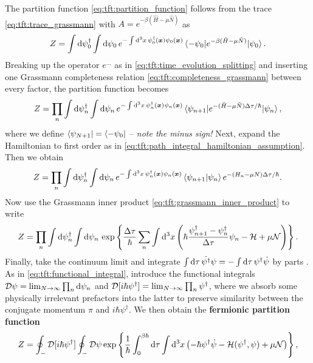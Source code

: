 The partition function \eqref{eq:tft:partition_function} follows from the trace \eqref{eq:tft:trace_grassmann} with $A = e^{-\beta (\hat{H} - \mu \hat{N})}$ as
\begin{equation}
	Z = \int \mathop{}\!\mathrm{d} \psi_0^\dagger \int \mathop{}\!\mathrm{d} \psi_0 \, e^{-\int \mathop{}\!\mathrm{d}^3 x \, \psi_{0}^\dagger({\bm{x}}) \psi_{0}({\bm{x}})} \braket{-\psi_0 | e^{-\beta(\hat{H} - \mu \hat{N})} | \psi_0} .
\end{equation}
Breaking up the operator $e^{\ldots}$ as in \cref{eq:tft:time_evolution_splitting} and inserting one Grassmann completeness relation \eqref{eq:tft:completeness_grassmann} between every factor, the partition function becomes
\begin{equation}
	Z = \prod_n \int \mathop{}\!\mathrm{d} \psi_n^\dagger \int \mathop{}\!\mathrm{d} \psi_n \, e^{-\int \mathop{}\!\mathrm{d}^3 x \, \psi_{n}^\dagger({\bm{x}}) \psi_{n}({\bm{x}})} \braket{\psi_{n+1} | e^{-(\hat{H} - \mu \hat{N}) \Delta \tau / \hbar} | \psi_n} ,
\end{equation}
where we define $\bra{\psi_{N+1}} = \bra{-\psi_0}$ -- \emph{note the minus sign!}
Next, expand the Hamiltonian to first order as in \cref{eq:tft:path_integral_hamiltonian_assumption}.
Then we obtain
\begin{equation}
	Z = \prod_n \int \mathop{}\!\mathrm{d} \psi_n^\dagger \int \mathop{}\!\mathrm{d} \psi_n \, e^{-\int \mathop{}\!\mathrm{d}^3 x \, \psi_{n}^\dagger({\bm{x}}) \psi_{n}({\bm{x}})} \braket{\psi_{n+1} | \psi_n} e^{-(H_n - \mu N) \Delta \tau / \hbar} .
\end{equation}
Now use the Grassmann inner product \eqref{eq:tft:grassmann_inner_product} to write
\begin{equation}
	Z = \prod_n \int \mathop{}\!\mathrm{d} \psi_n^\dagger \int \mathop{}\!\mathrm{d} \psi_n \, \exp \left\{ \frac{\Delta \tau}{\hbar} \sum_n \int \mathop{}\!\mathrm{d}^3 x \left( \hbar \frac{\psi^\dagger_{n+1} - \psi^\dagger_n}{\Delta \tau} \psi_{n} - \mathcal{H} + \mu \mathcal{N} \right) \right\} .
\end{equation}
Finally, take the continuum limit and integrate $\int \mathop{}\!\mathrm{d} \tau \, \dot{\psi^\dagger} \psi = -\int \mathop{}\!\mathrm{d} \tau \, \psi^\dagger \dot{\psi}$ by parts .
As in \eqref{eq:tft:functional_integral}, introduce the functional integrals $\mathcal{D} \psi = \lim_{N \rightarrow \infty} \prod_n \mathop{}\!\mathrm{d} \psi_n$ and $\mathcal{D} [i \hbar \psi^\dagger] = \lim_{N \rightarrow \infty} \prod_n \psi^\dagger$, where we absorb some physically irrelevant prefactors into the latter to preserve similarity between the conjugate momentum $\pi$ and $i \hbar \psi^\dagger$. 
We then obtain the \textbf{fermionic partition function}
\begin{equation}
	Z = \oint_- \mathcal{D} [i \hbar \psi^\dagger] \oint_- \mathcal{D} \psi \exp \left\{ \frac{1}{\hbar} \int_0^{\beta \hbar} \mathop{}\!\mathrm{d} \tau \int \mathop{}\!\mathrm{d}^3 x \left( -\hbar \psi^\dagger \dot{\psi} - \mathcal{H} ( \psi^\dagger, \psi ) + \mu \mathcal{N} \right) \right\} ,
\label{eq:tft:fermion_partition_function}
\end{equation}
